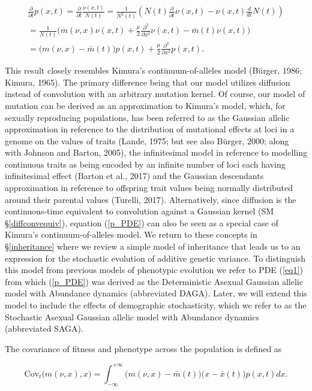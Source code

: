 \documentclass[]{elsarticle} %
\begin{document}
\begin{multline}\label{p_PDE}
\frac{\partial}{\partial t}p(x,t)=\frac{\partial}{\partial t}\frac{\nu(x,t)}{N(t)}=\frac{1}{N^2(t)}\left(N(t)\frac{\partial}{\partial t}\nu(x,t)-\nu(x,t)\frac{d}{dt}N(t)\right) \\
=\frac{1}{N(t)}\Big(m(\nu,x)\nu(x,t)+\frac{\mu}{2}\frac{\partial^2}{\partial x^2}\nu(x,t)-\bar m(t)\nu(x,t)\Big) \\
=\Big(m(\nu,x)-\bar m(t)\Big) p(x,t)+\frac{\mu}{2}\frac{\partial^2}{\partial x^2}p(x,t).
\end{multline}

This result closely resembles Kimura's continuum-of-alleles model
(Bürger, 1986; Kimura, 1965). The primary difference being that our
model utilizes diffusion instead of convolution with an arbitrary
mutation kernel. Of course, our model of mutation can be derived as an
approximation to Kimura's model, which, for sexually reproducing
populations, has been referred to as the Gaussian allelic approximation
in reference to the distribution of mutational effects at loci in a
genome on the values of traits (Lande, 1975; but see also Bürger, 2000;
along with Johnson and Barton, 2005), the infinitesimal model in
reference to modelling continuous traits as being encoded by an infinite
number of loci each having infinitesimal effect (Barton et al., 2017)
and the Gaussian descendants approximation in reference to offspring
trait values being normally distributed around their parental values
(Turelli, 2017). Alternatively, since diffusion is the continuous-time
equivalent to convolution against a Gaussian kernel (SM
\S\ref{diffconvequiv}), equation (\ref{p_PDE}) can also be seen as a
special case of Kimura's continuum-of-alleles model. We return to these
concepts in \S\ref{inheritance} where we review a simple model of
inheritance that leads us to an expression for the stochastic evolution
of additive genetic variance. To distinguish this model from previous
models of phenotypic evolution we refer to PDE (\ref{eq1}) from which
(\ref{p_PDE}) was derived as the Deterministic Asexual Gaussian allelic
model with Abundance dynamics (abbreviated DAGA). Later, we will extend
this model to include the effects of demographic stochasticity, which we
refer to as the Stochastic Asexual Gaussian allelic model with Abundance
dynamics (abbreviated SAGA).

The covariance of fitness and phenotype across the population is defined
as

\begin{equation}
\mathrm{Cov}_t\Big(m(\nu,x),x\Big)=\int_{-\infty}^{+\infty}\Big(m(\nu,x)-\bar m(t)\Big)\Big(x-\bar x(t)\Big)p(x,t)dx.
\end{equation}
\end{document}
